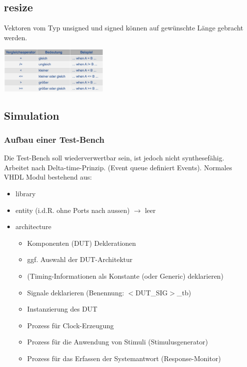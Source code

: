 \vspace{-3\baselineskip}
\begin{multicols}{2}
\subsection{resize}
	Vektoren vom Typ unsigned und signed können auf gewünschte Länge gebracht werden.
	
	\begin{center}
		\includegraphics[width=0.4\textwidth]{images/arithvergleich}
	\end{center}
\end{multicols}
\vspace{-2\baselineskip}
\begin{multicols}{2}
	\subsection{Simulation}
	\subsubsection{Aufbau einer Test-Bench}
	Die Test-Bench soll wiederverwertbar sein, ist jedoch nicht synthesefähig. Arbeitet nach Delta-time-Prinzip. (Event queue definiert Events). Normales VHDL Modul bestehend aus:
	\vspace{-\topsep}
	\begin{itemize}
	\setlength\itemsep{-0.5em}
		\item library
		\item entity (i.d.R. ohne Ports nach aussen) $\rightarrow$ leer
		\item architecture
		\begin{itemize}
			\setlength\itemsep{-0.5em}
			\item Komponenten (DUT) Deklerationen
			\item ggf. Auswahl der DUT-Architektur
			\item (Timing-Informationen als Konstante (oder 
				Generic) deklarieren)
			\item Signale deklarieren (Benennung: $<$DUT\_SIG$>$\_tb)
			\item Instanzierung des DUT
			\item Prozess für Clock-Erzeugung
			\item Prozess für die Anwendung von Stimuli 
				(Stimulusgenerator)
			\item Prozess für das Erfassen der Systemantwort 
				(Response-Monitor)
		\end{itemize}
	\end{itemize}
\end{multicols}

